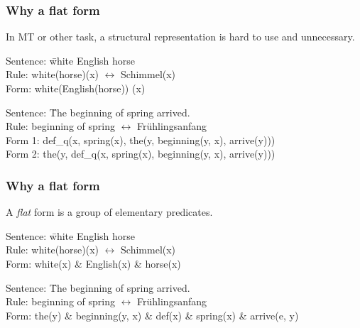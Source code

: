 \documentclass{beamer}
\begin{document}
\begin{frame}
    \frametitle{Why a flat form}

    In MT or other task, a structural representation is hard to use and unnecessary.

    \begin{examples}
        \begin{tabbing}
        Sentence:   \= white English horse \\
        Rule:       \> white(horse)(x) $\leftrightarrow$ Schimmel(x) \\
        Form:  \> white(English(horse)) (x)
        \end{tabbing}
    \end{examples}

    \begin{examples}
        \begin{tabbing}
        Sentence:   \= The beginning of spring arrived. \\
        Rule:       \> beginning of spring $\leftrightarrow$ Fr{\"u}hlingsanfang \\
        Form 1:  \> def\_q(x, spring(x), the(y, beginning(y, x), arrive(y))) \\
        Form 2:  \> the(y, def\_q(x, spring(x), beginning(y, x), arrive(y))) 
        \end{tabbing}
    \end{examples}

\end{frame}

\begin{frame}
    \frametitle{Why a flat form}

    A \emph{flat} form is a group of elementary predicates.

    \begin{examples}
        \begin{tabbing}
        Sentence:   \= white English horse \\
        Rule:       \> white(horse)(x) $\leftrightarrow$ Schimmel(x) \\
        Form:  \> white(x) \& English(x) \& horse(x)
        \end{tabbing}
    \end{examples}

    \begin{examples}
        \begin{tabbing}
        Sentence:   \= The beginning of spring arrived. \\
        Rule:       \> beginning of spring $\leftrightarrow$ Fr{\"u}hlingsanfang \\
        Form:  \> the(y) \& beginning(y, x) \& def(x) \& spring(x) \& arrive(e, y)
        \end{tabbing}
    \end{examples}

\end{frame}
\end{document}
